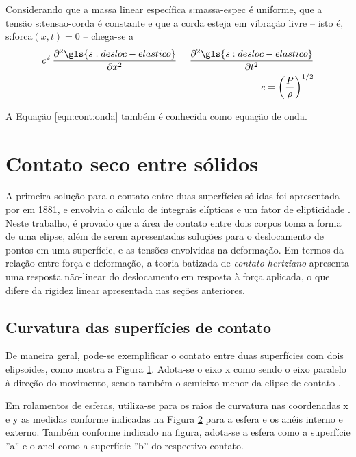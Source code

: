 \documentclass[12pt,oneside,english,brazil,lmodern,siglas,simbolos,cite=num]{ucsmonograph}
\begin{document}
	Considerando que a massa linear específica \gls{s:massa-espec} é uniforme, que a tensão \gls{s:tensao-corda} é constante e que a corda esteja em vibração livre -- isto é, \gls{s:forca}$(x,t) = 0$ -- chega-se a \cite{rao:2008}
	\begin{align}
		\mathit{c}^2\:\frac{\partial^2
		\gls{s:desloc-elastico}}{\partial x^2}=\frac{\partial^2
		\gls{s:desloc-elastico}}{\partial t^2} \label{eqn:cont:onda}\\
		\mathit{c} = \left(\frac{P}{\rho}\right)^{1/2}
	\end{align}
	
	A Equação \ref{eqn:cont:onda} também é conhecida como equação de onda. 
	
	\section{Contato seco entre sólidos}
	A primeira solução para o contato entre duas superfícies sólidas foi apresentada por  em 1881, e envolvia o cálculo de integrais elípticas e um fator de elipticidade \cite{hertz:1881}.
	Neste trabalho, é provado que a área de contato entre dois corpos toma a forma de uma elipse, além de serem apresentadas soluções para o deslocamento de pontos em uma superfície, e as tensões envolvidas na deformação.
	Em termos da relação entre força e deformação, a teoria batizada de \emph{contato hertziano} apresenta uma resposta não-linear do deslocamento em resposta à força aplicada, o que difere da rigidez linear apresentada nas seções anteriores.
	
	\subsection{Curvatura das superfícies de contato} \label{sec:curvatura-contato}
	De maneira geral, pode-se exemplificar o contato entre duas superfícies com dois elipsoides, como mostra a Figura \ref{fig:contato-elipses}.
	Adota-se o eixo x como sendo o eixo paralelo à direção do movimento, sendo também o semieixo menor da elipse de contato \cite{hamrock:1991}.
	\begin{figure}[h]
		\label{fig:contato-elipses}
	\end{figure}

	Em rolamentos de esferas, utiliza-se para os raios de curvatura nas coordenadas x e y as medidas conforme indicadas na Figura \ref{fig:raios-rolamento} para a esfera e os anéis interno e externo.
	Também conforme indicado na figura, adota-se a esfera como a superfície ''a'' e o anel como a superfície ''b'' do respectivo contato.
	\begin{figure}[b]
		\label{fig:raios-rolamento}
	\end{figure}
\end{document}
